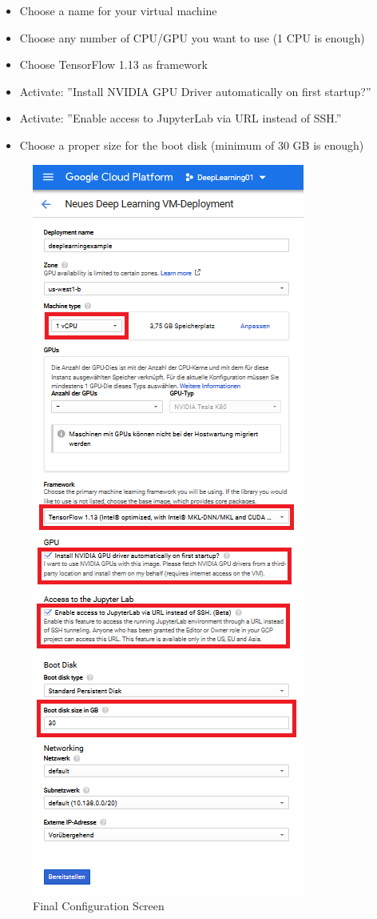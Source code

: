 \documentclass[a4paper]{article}
\begin{document}
\begin{itemize}
	\item Choose a name for your virtual machine
	\item Choose any number of CPU/GPU you want to use (1 CPU is enough)
	\item Choose TensorFlow 1.13 as framework
	\item Activate: ''Install NVIDIA GPU Driver automatically on first startup?''
	\item Activate: ''Enable access to JupyterLab via URL instead of SSH.''
	\item Choose a proper size for the boot disk (minimum of 30 GB is enough)
\end{itemize}
\begin{figure}
	\centerline{\includegraphics[scale=0.92]{img/finalConfig}}
	\caption{Final Configuration Screen}
	\label{fig_finalConfig}
\end{figure}
\end{document}
